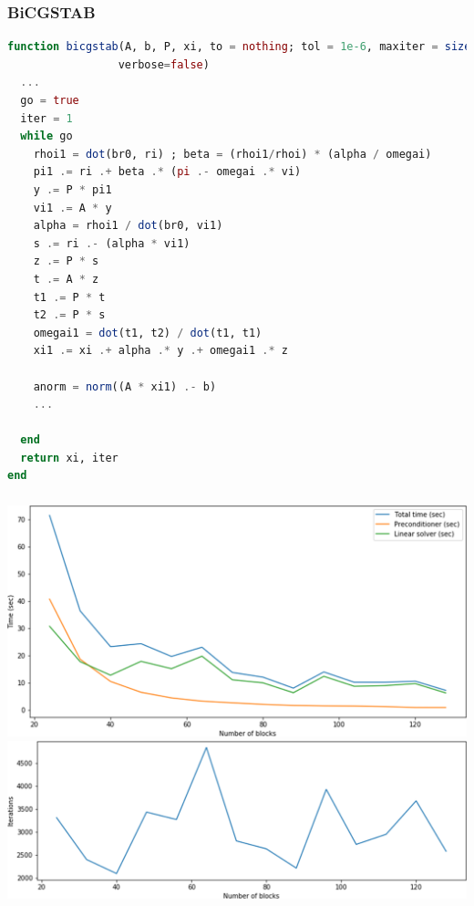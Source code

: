 \begin{frame}[fragile]
  \frametitle{BiCGSTAB}
  \begin{lstlisting}[language=julia, style=jlcodestyle]
function bicgstab(A, b, P, xi, to = nothing; tol = 1e-6, maxiter = size(A,1),
                 verbose=false)
  ...
  go = true
  iter = 1
  while go
    rhoi1 = dot(br0, ri) ; beta = (rhoi1/rhoi) * (alpha / omegai)
    pi1 .= ri .+ beta .* (pi .- omegai .* vi)
    y .= P * pi1
    vi1 .= A * y
    alpha = rhoi1 / dot(br0, vi1)
    s .= ri .- (alpha * vi1)
    z .= P * s
    t .= A * z
    t1 .= P * t
    t2 .= P * s
    omegai1 = dot(t1, t2) / dot(t1, t1)
    xi1 .= xi .+ alpha .* y .+ omegai1 .* z
  
    anorm = norm((A * xi1) .- b)
    ...

  end
  return xi, iter
end
  \end{lstlisting}
\end{frame}

\begin{frame}
  \frametitle{}
   \includegraphics[width=\textwidth]{figures/blocks}
   \includegraphics[width=\textwidth]{figures/bicgstabiter}
\end{frame}




